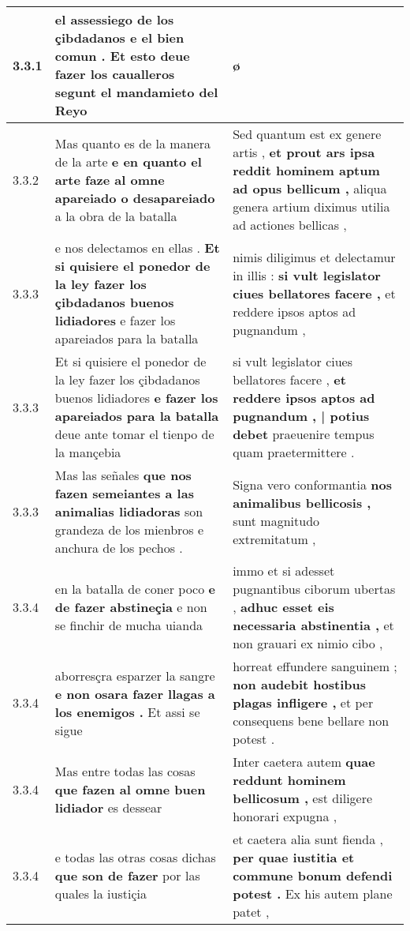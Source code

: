 \begin{tabular}{|p{1cm}|p{6.5cm}|p{6.5cm}|}
3.3.1 & el assessiego de los çibdadanos e el bien comun . \textbf{ Et esto deue fazer los caualleros } segunt el mandamieto del Reyo & ø \\\hline
3.3.2 & Mas quanto es de la manera de la arte \textbf{ e en quanto el arte faze al omne apareiado o desapareiado } a la obra de la batalla & Sed quantum est ex genere artis , \textbf{ et prout ars ipsa reddit hominem aptum ad opus bellicum , } aliqua genera artium diximus utilia ad actiones bellicas , \\\hline
3.3.3 & e nos delectamos en ellas . \textbf{ Et si quisiere el ponedor de la ley fazer los çibdadanos buenos lidiadores } e fazer los apareiados para la batalla & nimis diligimus et delectamur in illis : \textbf{ si vult legislator ciues bellatores facere , } et reddere ipsos aptos ad pugnandum , \\\hline
3.3.3 & Et si quisiere el ponedor de la ley fazer los çibdadanos buenos lidiadores \textbf{ e fazer los apareiados para la batalla } deue ante tomar el tienpo de la mançebia & si vult legislator ciues bellatores facere , \textbf{ et reddere ipsos aptos ad pugnandum , | potius debet } praeuenire tempus quam praetermittere . \\\hline
3.3.3 & Mas las señales \textbf{ que nos fazen semeiantes a las animalias lidiadoras } son grandeza de los mienbros e anchura de los pechos . & Signa vero conformantia \textbf{ nos animalibus bellicosis , } sunt magnitudo extremitatum , \\\hline
3.3.4 & en la batalla de coner poco \textbf{ e de fazer abstineçia } e non se finchir de mucha uianda & immo et si adesset pugnantibus ciborum ubertas , \textbf{ adhuc esset eis necessaria abstinentia , } et non grauari ex nimio cibo , \\\hline
3.3.4 & aborresçra esparzer la sangre \textbf{ e non osara fazer llagas a los enemigos . } Et assi se sigue & horreat effundere sanguinem ; \textbf{ non audebit hostibus plagas infligere , } et per consequens bene bellare non potest . \\\hline
3.3.4 & Mas entre todas las cosas \textbf{ que fazen al omne buen lidiador } es dessear & Inter caetera autem \textbf{ quae reddunt hominem bellicosum , } est diligere honorari expugna , \\\hline
3.3.4 & e todas las otras cosas dichas \textbf{ que son de fazer } por las quales la iustiçia & et caetera alia sunt fienda , \textbf{ per quae iustitia et commune bonum defendi potest . } Ex his autem plane patet , \\\hline

\end{tabular}
